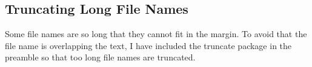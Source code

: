 \subsection{Truncating Long File Names}
\label{task:20140827_jkn0}
Some file names are so long that they cannot fit in the margin. To avoid that the file name is overlapping the text, I have included the truncate package in the preamble so that too long file names are truncated.
